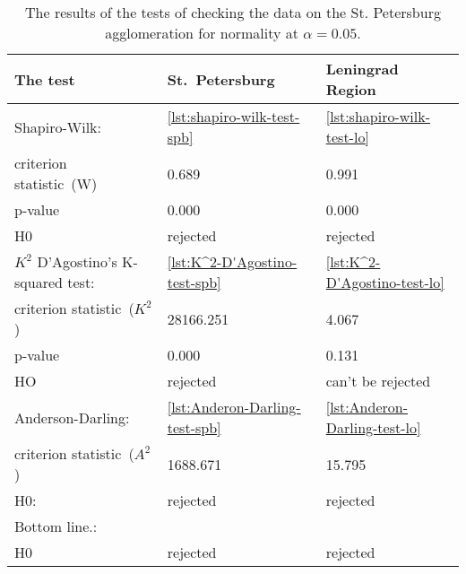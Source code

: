 \documentclass[]{scrreprt}
\begin{document}
\begin{table}[htp]
	\caption{The results of the tests of checking the data on the St. Petersburg agglomeration for normality at $\alpha=0.05$.}\label{tab:normality-tests-values}
	\centering
	\begin{tabular}{lll}
		\hline
		The test&St.~Petersburg&Leningrad Region\\
		\hline
		Shapiro-Wilk:&\ref{lst:shapiro-wilk-test-spb}&\ref{lst:shapiro-wilk-test-lo}\\
		criterion statistic~(W)&0.689&0.991\\
		p-value&0.000&0.000\\
		H0&rejected&rejected\\
		\hline
		$K^{2}$ D'Agostino's K-squared test:&\ref{lst:K^2-D'Agostino-test-spb}&\ref{lst:K^2-D'Agostino-test-lo}\\
		criterion statistic~($K^{2}$)&28166.251&4.067\\
	    p-value&0.000&0.131\\
		HO&rejected&can't be rejected\\
		\hline
		Anderson-Darling:&\ref{lst:Anderon-Darling-test-spb}&\ref{lst:Anderon-Darling-test-lo}\\
		criterion statistic~($A^{2}$)&1688.671&15.795\\
		H0:&rejected&rejected\\
		\hline
		Bottom line.:&&\\
		H0&rejected&rejected\\
		\hline
	\end{tabular}
\end{table}
%
\end{document}
